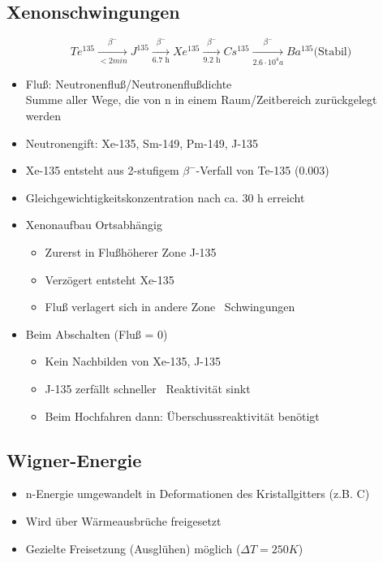 \documentclass[12pt]{article}
\begin{document}
\subsection{Xenonschwingungen}
\[
Te^{135}
\xrightarrow[< 2 min]{\beta^-}
J^{135}
\xrightarrow[\text{6.7 h}]{\beta^-}
Xe^{135}
\xrightarrow[\text{9.2 h}]{\beta^-}
Cs^{135}
\xrightarrow[2.6\cdot10^4a]{\beta^-}
Ba^{135} \text{(Stabil)}
\]
\begin{itemize}
  \item Fluß: Neutronenfluß/Neutronenflußdichte\\
        Summe aller Wege, die von n in einem Raum/Zeitbereich zurückgelegt werden
  \item Neutronengift: Xe-135, Sm-149, Pm-149, J-135
  \item Xe-135 entsteht aus 2-stufigem \(\beta^-\)-Verfall von Te-135 (0.003)
  \item Gleichgewichtigkeitskonzentration nach ca. 30 h erreicht
  \item Xenonaufbau Ortsabhängig
  \begin{itemize}
    \item Zurerst in Flußhöherer Zone J-135
    \item Verzögert entsteht Xe-135
    \item Fluß verlagert sich in andere Zone \textrightarrow\ Schwingungen
  \end{itemize}
  \item Beim Abschalten (Fluß = 0)
  \begin{itemize}
    \item Kein Nachbilden von Xe-135, J-135
    \item J-135 zerfällt schneller \textrightarrow\ Reaktivität sinkt
    \item Beim Hochfahren dann: Überschussreaktivität benötigt
  \end{itemize}
\end{itemize}

\subsection{Wigner-Energie}
\begin{itemize}
  \item n-Energie umgewandelt in Deformationen des Kristallgitters (z.B. C)
  \item Wird über Wärmeausbrüche freigesetzt
  \item Gezielte Freisetzung (Ausglühen) möglich (\(\Delta T = 250K\))
\end{itemize}
\end{document}
